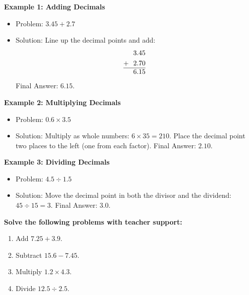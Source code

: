 \documentclass[12pt]{article}
\begin{document}
\vspace{1em}

\begin{tcolorbox}[colframe=black!60, colback=white, 
coltitle=black, colbacktitle=black!15, fonttitle=\bfseries\Large, 
title=Examples, halign title=center, left=10pt, right=10pt, top=10pt, bottom=15pt]
\textbf{Example 1: Adding Decimals}
\begin{itemize}
    \item Problem: \( 3.45 + 2.7 \)
    \item Solution: Line up the decimal points and add:
    \[
    \begin{aligned}
        & \,\,\,\,3.45 \\
        + & \,\,\,\,2.70 \\
        \hline
        & \,\,\,\,6.15
    \end{aligned}
    \]
    Final Answer: \( 6.15 \).
\end{itemize}

\textbf{Example 2: Multiplying Decimals}
\begin{itemize}
    \item Problem: \( 0.6 \times 3.5 \)
    \item Solution: Multiply as whole numbers: \( 6 \times 35 = 210 \). Place the decimal point two places to the left (one from each factor). Final Answer: \( 2.10 \).
\end{itemize}

\textbf{Example 3: Dividing Decimals}
\begin{itemize}
    \item Problem: \( 4.5 \div 1.5 \)
    \item Solution:
    Move the decimal point in both the divisor and the dividend: \( 45 \div 15 = 3 \). Final Answer: \( 3.0 \).
\end{itemize}
\end{tcolorbox}

\vspace{1em}

\begin{tcolorbox}[colframe=black!60, colback=white, 
coltitle=black, colbacktitle=black!15, fonttitle=\bfseries\Large, 
title=Guided Practice, halign title=center, left=10pt, right=10pt, top=10pt, bottom=15pt]
\textbf{Solve the following problems with teacher support:}
\begin{enumerate}[itemsep=5em] 
    \item Add \( 7.25 + 3.9 \). 
    \item Subtract \( 15.6 - 7.45 \). 
    \item Multiply \( 1.2 \times 4.3 \). 
    \item Divide \( 12.5 \div 2.5 \).
\end{enumerate}
\end{tcolorbox}
\end{document}
